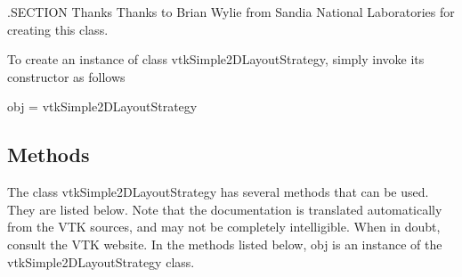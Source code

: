 .S\-E\-C\-T\-I\-O\-N Thanks Thanks to Brian Wylie from Sandia National Laboratories for creating this class.

To create an instance of class vtk\-Simple2\-D\-Layout\-Strategy, simply invoke its constructor as follows \begin{DoxyVerb}  obj = vtkSimple2DLayoutStrategy
\end{DoxyVerb}
 \hypertarget{vtkwidgets_vtkxyplotwidget_Methods}{}\subsection{Methods}\label{vtkwidgets_vtkxyplotwidget_Methods}
The class vtk\-Simple2\-D\-Layout\-Strategy has several methods that can be used. They are listed below. Note that the documentation is translated automatically from the V\-T\-K sources, and may not be completely intelligible. When in doubt, consult the V\-T\-K website. In the methods listed below, {\ttfamily obj} is an instance of the vtk\-Simple2\-D\-Layout\-Strategy class. 
